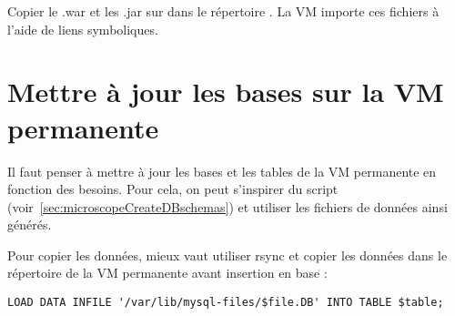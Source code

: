 Copier le .war et les .jar sur  dans le répertoire .
La VM  importe ces fichiers à l'aide de liens symboliques.

\section{Mettre à jour les bases sur la VM permanente} \label{sec:maj_vm_permanente}

Il faut penser à mettre à jour les bases et les tables de la VM permanente en fonction des besoins.
Pour cela, on peut s'inspirer du script  (voir~\autoref{sec:microscopeCreateDBschemas})
et utiliser les fichiers de données ainsi générés.

Pour copier les données, mieux vaut utiliser rsync et copier les données dans le répertoire  de la VM permanente avant insertion en base :
\begin{lstlisting}[style=SQL]
LOAD DATA INFILE '/var/lib/mysql-files/$file.DB' INTO TABLE $table;
\end{lstlisting}
